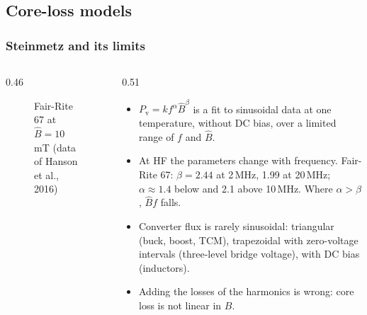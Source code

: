 \subsection{Core-loss models}

\begin{frame}
	\frametitle{Steinmetz and its limits}
	\begin{columns}[T]
		\begin{column}{0.46\textwidth}
			\begin{figure}
				\centering
				\caption{Fair-Rite 67 at $\hat{B}=10$\,mT (data of Hanson et al., 2016)}
			\end{figure}
		\end{column}
		\begin{column}{0.51\textwidth}
			\small
			\begin{itemize}
				\item $P_\mathrm{v}=kf^{\alpha}\hat{B}^{\beta}$ is a fit to sinusoidal data at one temperature, without DC bias, over a limited range of $f$ and $\hat{B}$.
				\item At HF the parameters change with frequency. Fair-Rite 67: $\beta=2.44$ at 2\,MHz, 1.99 at 20\,MHz; $\alpha\approx1.4$ below and 2.1 above 10\,MHz. Where $\alpha>\beta$, $\hat{B}f$ falls.
				\item Converter flux is rarely sinusoidal: triangular (buck, boost, TCM), trapezoidal with zero-voltage intervals (three-level bridge voltage), with DC bias (inductors).
				\item Adding the losses of the harmonics is wrong: core loss is not linear in $B$.
			\end{itemize}
		\end{column}
	\end{columns}
\end{frame}

